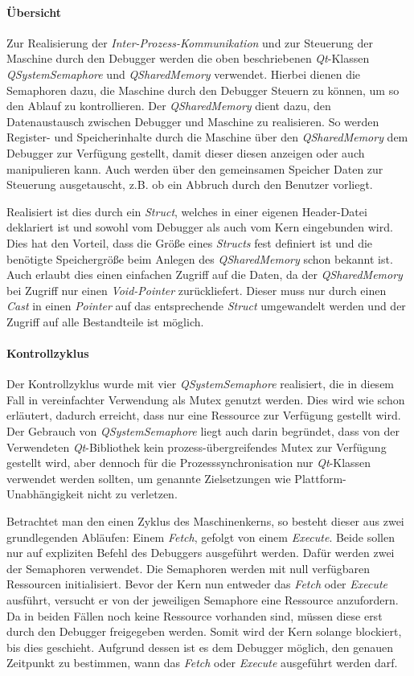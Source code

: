 \paragraph{Übersicht}
Zur Realisierung der \emph{Inter-Prozess-Kommunikation} und zur Steuerung der Maschine durch den Debugger werden die oben beschriebenen \emph{Qt}-Klassen \emph{QSystemSemaphore} und \emph{QSharedMemory} verwendet. Hierbei dienen die Semaphoren dazu, die Maschine durch den Debugger Steuern zu können, um so den Ablauf zu kontrollieren. Der \emph{QSharedMemory} dient dazu, den Datenaustausch zwischen Debugger und Maschine zu realisieren. So werden Register- und Speicherinhalte durch die Maschine über den \emph{QSharedMemory} dem Debugger zur Verfügung gestellt, damit dieser diesen anzeigen oder auch manipulieren kann. Auch werden über den gemeinsamen Speicher Daten zur Steuerung ausgetauscht, z.B. ob ein Abbruch durch den Benutzer vorliegt.

Realisiert ist dies durch ein \emph{Struct}, welches in einer eigenen Header-Datei deklariert ist und sowohl vom Debugger als auch vom Kern eingebunden wird. Dies hat den Vorteil, dass die Größe eines \emph{Structs} fest definiert ist und die benötigte Speichergröße beim Anlegen des \emph{QSharedMemory} schon bekannt ist. Auch erlaubt dies einen einfachen Zugriff auf die Daten, da der \emph{QSharedMemory} bei Zugriff nur einen \emph{Void-Pointer} zurückliefert. Dieser muss nur durch einen \emph{Cast} in einen \emph{Pointer} auf das entsprechende \emph{Struct} umgewandelt werden und der Zugriff auf alle Bestandteile ist möglich.

\paragraph{Kontrollzyklus}
Der Kontrollzyklus wurde mit vier \emph{QSystemSemaphore} realisiert, die in diesem Fall in vereinfachter Verwendung als Mutex genutzt werden. Dies wird wie schon erläutert, dadurch erreicht, dass nur eine Ressource zur Verfügung gestellt wird. Der Gebrauch von \emph{QSystemSemaphore} liegt auch darin begründet, dass von der Verwendeten \emph{Qt}-Bibliothek kein prozess-übergreifendes Mutex zur Verfügung gestellt wird, aber dennoch für die Prozesssynchronisation nur \emph{Qt}-Klassen verwendet werden sollten, um genannte Zielsetzungen wie Plattform-Unabhängigkeit nicht zu verletzen.

Betrachtet man den einen Zyklus des Maschinenkerns, so besteht dieser aus zwei grundlegenden Abläufen: Einem \emph{Fetch}, gefolgt von einem \emph{Execute}. Beide sollen nur auf expliziten Befehl des Debuggers ausgeführt werden. Dafür werden zwei der Semaphoren verwendet. Die Semaphoren werden mit null verfügbaren Ressourcen initialisiert. Bevor der Kern nun entweder das \emph{Fetch} oder \emph{Execute} ausführt, versucht er von der jeweiligen Semaphore eine Ressource anzufordern. Da in beiden Fällen noch keine Ressource vorhanden sind, müssen diese erst durch den Debugger freigegeben werden. Somit wird der Kern solange blockiert, bis dies geschieht. Aufgrund dessen ist es dem Debugger möglich, den genauen Zeitpunkt zu bestimmen, wann das \emph{Fetch} oder \emph{Execute} ausgeführt werden darf.

